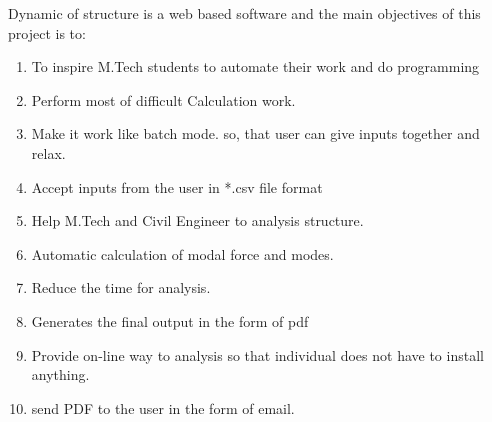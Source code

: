 Dynamic of structure is a web based software and the 
main objectives of this project is to:
\begin{enumerate}
\item To inspire M.Tech students to automate their work and do programming 
\item Perform most of difficult Calculation work.
\item Make it work like batch mode. so, that user can give inputs 
together and relax.
\item Accept inputs from the user in *.csv file format
\item Help M.Tech and Civil Engineer to analysis structure.
\item Automatic calculation of modal force and modes.
\item Reduce the time for analysis.
\item Generates the final output in the form of pdf
\item Provide on-line way to analysis so that individual does not have to 
install anything.
\item send PDF to the user in the form of email.
\end{enumerate}
